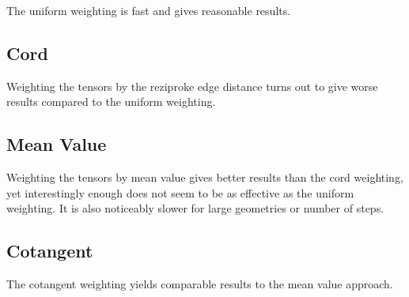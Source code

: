 \documentclass[a4paper,10pt,notitlepage]{scrreprt}
\begin{document}
The uniform weighting is fast and gives reasonable results.

\subsection{Cord}

Weighting the tensors by the reziproke edge distance turns out to give worse
results compared to the uniform weighting.

\subsection{Mean Value}

Weighting the tensors by mean value gives better results than the cord
weighting, yet interestingly enough does not seem to be as effective as the
uniform weighting. It is also noticeably slower for large geometries or number
of steps.

\subsection{Cotangent}

The cotangent weighting yields comparable results to the mean value approach.
\end{document}
